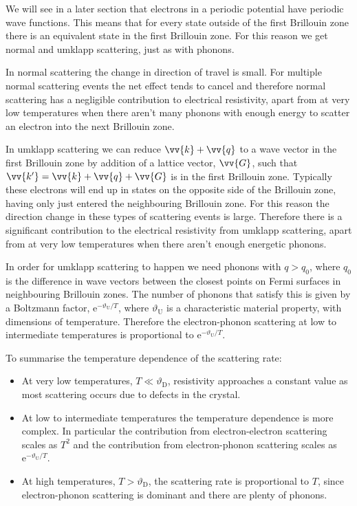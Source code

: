 \documentclass[fleqn]{NotesClass}
\newcommand*{\e}{\mathrm{e}}
\newcommand*{\debye}{\mathrm{D}}
\newcommand*{\umklapp}{\mathrm{U}}
\begin{document}
    We will see in a later section %
    that electrons in a periodic potential have periodic wave functions.
    This means that for every state outside of the first Brillouin zone there is an equivalent state in the first Brillouin zone.
    For this reason we get normal and umklapp scattering, just as with phonons.
    
    In normal scattering the change in direction of travel is small.
    For multiple normal scattering events the net effect tends to cancel and therefore normal scattering has a negligible contribution to electrical resistivity, apart from at very low temperatures when there aren't many phonons with enough energy to scatter an electron into the next Brillouin zone.
    
    In umklapp scattering we can reduce \(\vv{k} + \vv{q}\) to a wave vector in the first Brillouin zone by addition of a lattice vector, \(\vv{G}\), such that \(\vv{k'} = \vv{k} + \vv{q} + \vv{G}\) is in the first Brillouin zone.
    Typically these electrons will end up in states on the opposite side of the Brillouin zone, having only just entered the neighbouring Brillouin zone.
    For this reason the direction change in these types of scattering events is large.
    Therefore there is a significant contribution to the electrical resistivity from umklapp scattering, apart from at very low temperatures when there aren't enough energetic phonons.
    
    In order for umklapp scattering to happen we need phonons with \(q > q_0\), where \(q_0\) is the difference in wave vectors between the closest points on Fermi surfaces in neighbouring Brillouin zones.
    The number of phonons that satisfy this is given by a Boltzmann factor, \(\e^{-\vartheta_{\umklapp}/T}\), where \(\vartheta_{\umklapp}\) is a characteristic material property, with dimensions of temperature.
    Therefore the electron-phonon scattering at low to intermediate temperatures is proportional to \(\e^{-\vartheta_{\umklapp}/T}\).
    
    To summarise the temperature dependence of the scattering rate:
    \begin{itemize}
        \item At very low temperatures, \(T \ll \vartheta_{\debye}\), resistivity approaches a constant value as most scattering occurs due to defects in the crystal.
        \item At low to intermediate temperatures the temperature dependence is more complex.
        In particular the contribution from electron-electron scattering scales as \(T^2\) and the contribution from electron-phonon scattering scales as \(\e^{-\vartheta_{\umklapp}/T}\).
        \item At high temperatures, \(T > \vartheta_{\debye}\), the scattering rate is proportional to \(T\), since electron-phonon scattering is dominant and there are plenty of phonons.
    \end{itemize}
    
\end{document}
